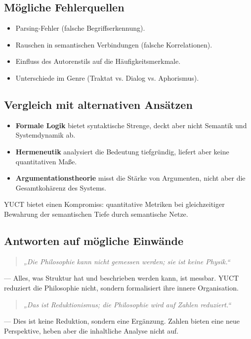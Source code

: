 \documentclass[12pt,a4paper]{article}
\begin{document}
	\subsection{Mögliche Fehlerquellen}
	
	\begin{itemize}
		\item Parsing-Fehler (falsche Begriffserkennung).
		\item Rauschen in semantischen Verbindungen (falsche Korrelationen).
		\item Einfluss des Autorenstils auf die Häufigkeitsmerkmale.
		\item Unterschiede im Genre (Traktat vs. Dialog vs. Aphorismus).
	\end{itemize}
	
	\subsection{Vergleich mit alternativen Ansätzen}
	
	\begin{itemize}
		\item \textbf{Formale Logik} bietet syntaktische Strenge, deckt aber nicht Semantik und Systemdynamik ab.
		\item \textbf{Hermeneutik} analysiert die Bedeutung tiefgründig, liefert aber keine quantitativen Maße.
		\item \textbf{Argumentationstheorie} misst die Stärke von Argumenten, nicht aber die Gesamtkohärenz des Systems.
	\end{itemize}
	YUCT bietet einen Kompromiss: quantitative Metriken bei gleichzeitiger Bewahrung der semantischen Tiefe durch semantische Netze.
	
	\subsection{Antworten auf mögliche Einwände}
	
	\begin{quote}
		\textit{„Die Philosophie kann nicht gemessen werden; sie ist keine Physik.“}
	\end{quote}
	— Alles, was Struktur hat und beschrieben werden kann, ist messbar. YUCT reduziert die Philosophie nicht, sondern formalisiert ihre innere Organisation.
	
	\begin{quote}
		\textit{„Das ist Reduktionismus; die Philosophie wird auf Zahlen reduziert.“}
	\end{quote}
	— Dies ist keine Reduktion, sondern eine Ergänzung. Zahlen bieten eine neue Perspektive, heben aber die inhaltliche Analyse nicht auf.
	
\end{document}
